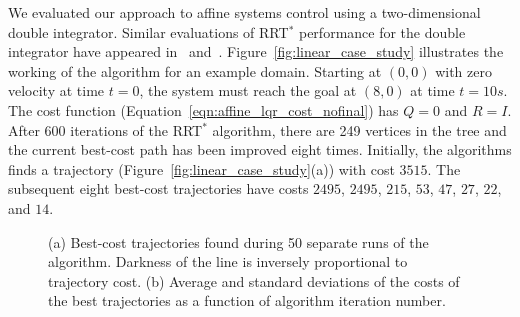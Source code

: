 \documentclass[letterpaper, 10pt, english, conference]{IEEEtran}
\begin{document}
We evaluated our approach to affine systems control using a
two-dimensional double integrator. Similar evaluations of RRT$^*$
performance for the double integrator have appeared
in~\cite{karaman_cdc10}
and~\cite{webb_berg}. Figure~\ref{fig:linear_case_study} illustrates
the working of the algorithm for an example domain. Starting at
$(0,0)$ with zero velocity at time $t=0$, the system must reach the
goal at $(8,0)$ at time $t=10s$. The cost function
(Equation~\ref{eqn:affine_lqr_cost_nofinal}) has $Q=0$ and
$R=I$. After 600 iterations of the RRT$^*$ algorithm, there are 249
vertices in the tree and the current best-cost path has been improved
eight times. Initially, the algorithms finds a trajectory
(Figure~\ref{fig:linear_case_study}(a)) with cost $3515$. The
subsequent eight best-cost trajectories have costs $2495$, $2495$,
$215$, $53$, $47$, $27$, $22$, and $14$.

\begin{figure}
\begin{center}
  \begin{center}
  \end{center}
\end{center}
\caption{(a) Best-cost trajectories found during 50 separate runs of
  the algorithm. Darkness of the line is inversely proportional to
  trajectory cost. (b) Average and standard deviations of the costs of
  the best trajectories as a function of algorithm iteration number.}
\label{fig:linear_case_study2}
\end{figure}
\end{document}
